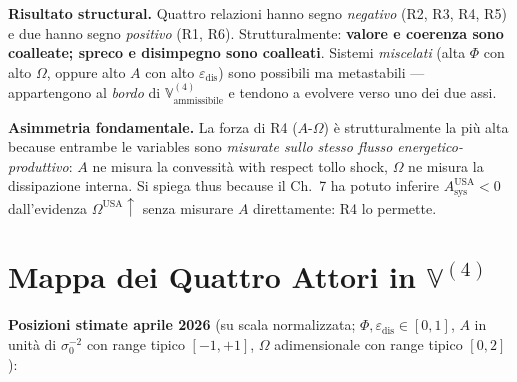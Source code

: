 \Proved{} \textbf{Risultato structural.} Quattro relazioni hanno segno
\emph{negativo} (R2, R3, R4, R5) e due hanno segno \emph{positivo} (R1,
R6). Strutturalmente: \textbf{valore e coerenza sono coalleate; spreco e
disimpegno sono coalleati}. Sistemi \emph{miscelati} (alta \(\Phi\) con
alto \(\Omega\), oppure alto \(A\) con alto
\(\varepsilon_{\text{dis}}\)) sono possibili ma metastabili ---
appartengono al \emph{bordo} di
\(\mathbb{V}^{(4)}_{\text{ammissibile}}\) e tendono a evolvere verso uno
dei due assi.

\Hypoth{} \textbf{Asimmetria fondamentale.} La forza di R4
(\(A\)-\(\Omega\)) è strutturalmente la più alta because entrambe le
variables sono \emph{misurate sullo stesso flusso
energetico-produttivo}: \(A\) ne misura la convessità with respect tollo
shock, \(\Omega\) ne misura la dissipazione interna. Si spiega thus
because il Ch.~7 ha potuto inferire \(A_{\text{sys}}^{\text{USA}} < 0\)
dall'evidenza \(\Omega^{\text{USA}} \uparrow\) senza misurare \(A\)
direttamente: R4 lo permette.



\section{\texorpdfstring{Mappa dei Quattro Attori in
\(\mathbb{V}^{(4)}\)}{Mappa dei Quattro Attori in \textbackslash mathbb\{V\}\^{}\{(4)\}}}\label{mappa-dei-quattro-attori-in-mathbbv4}

\Proved{} \textbf{Posizioni stimate aprile 2026} (su scala normalizzata;
\(\Phi, \varepsilon_{\text{dis}} \in [0,1]\), \(A\) in unità di
\(\sigma_0^{-2}\) con range tipico \([-1, +1]\), \(\Omega\)
adimensionale con range tipico \([0, 2]\)):

